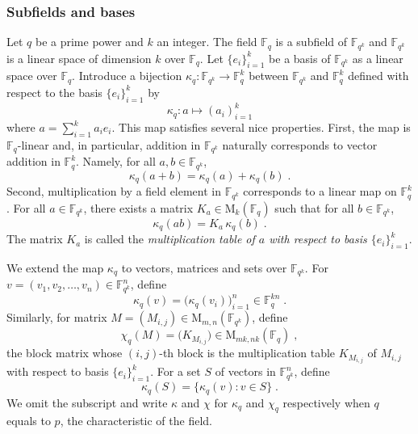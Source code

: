 \documentclass[11pt]{article}
\theoremstyle{definition}
\newcommand{\F}{\ensuremath{\mathbb{F}}}
\newcommand{\Fq}{\F_q}
\newcommand{\downsize}{\kappa}
\newcommand{\downsizem}{\chi}
\newcommand{\Matrix}{\mathrm{M}}
\begin{document}
\subsubsection{Subfields and bases}

Let $q$ be a prime power and $k$ an integer. 
The field $\Fq$ is a subfield of $\F_{q^k}$ and $\F_{q^k}$ is a linear space of
dimension $k$ over $\Fq$.
Let $\{ e_i \}_{i=1}^k$ be a basis of $\F_{q^k}$ as a linear space over $\Fq$.
Introduce a bijection $\downsize_q : \F_{q^k} \rightarrow \Fq^k$ between
$\F_{q^k}$ and $\Fq^k$ defined with respect to the basis $\{ e_i \}_{i=1}^k$ by
\begin{equation*}
  \downsize_q : a \mapsto (a_i)_{i=1}^k
\end{equation*}
where $a = \sum_{i=1}^k a_i e_i$.
This map satisfies several nice properties.
First, the map is $\Fq$-linear and, in particular, addition in $\F_{q^k}$
naturally corresponds to vector addition in $\Fq^k$.
Namely, for all $a,b \in \F_{q^k}$,
\begin{equation*}
	\downsize_q (a + b) = \downsize_q(a) + \downsize_q(b)\;.
\end{equation*}
Second, multiplication by a field element in $\F_{q^k}$ corresponds to a linear
map on $\F_{q}^k$.
For all $a \in \F_{q^k}$, there exists a matrix $K_a \in \Matrix_k (\Fq)$ such
that for all $b \in \F_{q^k}$,
\begin{equation*}
	\downsize_q (a b) = K_a \, \downsize_q(b)\;.
\end{equation*}
The matrix $K_a$ is called the \emph{multiplication table of $a$ with respect to
  basis $\{e_i\}_{i=1}^k$}.

We extend the map $\downsize_q$ to vectors, matrices and sets over $\F_{q^k}$.
For $v = (v_1, v_2, \ldots, v_n) \in \F_{q^k}^n$, define
\begin{equation*}
  \downsize_q (v) = \bigl( \downsize_q (v_i) \bigr)_{i=1}^n \in \Fq^{kn}\;.
\end{equation*}
Similarly, for matrix $M = (M_{i, j}) \in \Matrix_{m, n}(\F_{q^k})$, define
\begin{equation*}
  \downsizem_q (M) = \bigl( K_{M_{i, j}} \bigr) \in \Matrix_{mk, nk} (\Fq)\;,
\end{equation*}
the block matrix whose $(i,j)$-th block is the multiplication table $K_{M_{i,
    j}}$ of $M_{i, j}$ with respect to basis $\{e_i\}_{i=1}^k$.
For a set $S$ of vectors in $\F_{q^k}^n$, define
\begin{equation*}
	\downsize_q(S) = \{ \downsize_q(v) : v \in S \}\;.
\end{equation*}
We omit the subscript and write $\downsize$ and $\downsizem$ for $\downsize_q$
and $\downsizem_q$ respectively when $q$ equals to $p$, the characteristic of
the field.
\end{document}
